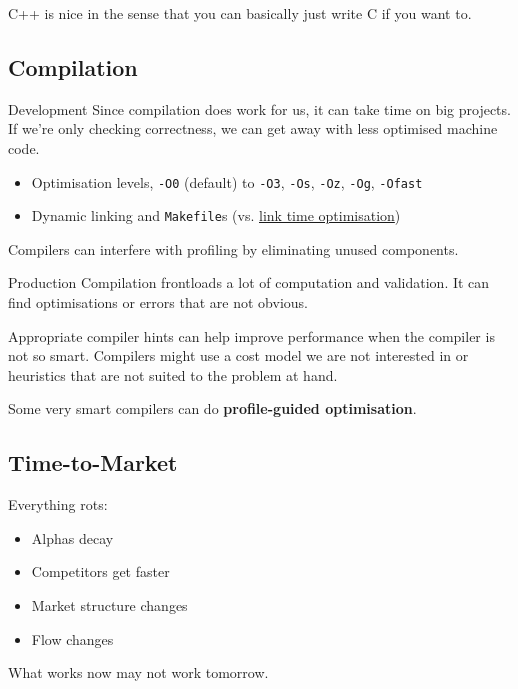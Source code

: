 \documentclass{article}
\begin{document}
C++ is nice in the sense that you can basically just write C if you want to.


\subsection{Compilation}
\begin{block}{Development}
	Since compilation does work for us, it can take time on big projects. If we're only checking correctness, we can get away with less optimised machine code.

	\begin{itemize}
	\item Optimisation levels, \texttt{-O0} (default) to \texttt{-O3}, \texttt{-Os}, \texttt{-Oz}, \texttt{-Og}, \texttt{-Ofast}
	\item Dynamic linking and \texttt{Makefile}s (vs. \href{https://llvm.org/docs/LinkTimeOptimization.html}{link time optimisation})
	\end{itemize}

	Compilers can interfere with profiling by eliminating unused components.
\end{block}

\begin{block}{Production}
	Compilation frontloads a lot of computation and validation. It can find optimisations or errors that are not obvious.

	Appropriate compiler hints can help improve performance when the compiler is not so smart. Compilers might use a cost model we are not interested in or heuristics that are not suited to the problem at hand.

	Some very smart compilers can do \textbf{profile-guided optimisation}.
\end{block}

\subsection{Time-to-Market}
Everything rots:
\begin{itemize}
	\item Alphas decay
	\item Competitors get faster
	\item Market structure changes
	\item Flow changes
\end{itemize}

What works now may not work tomorrow.
\end{document}
